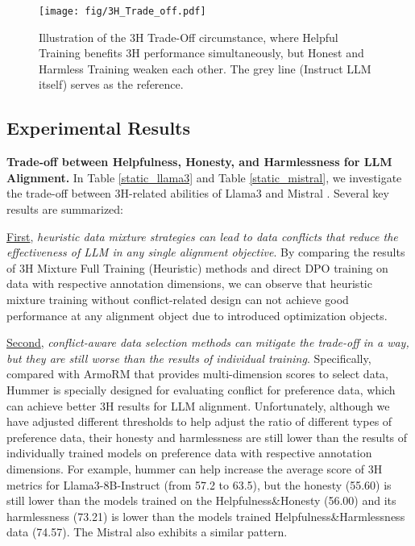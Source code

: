 \begin{figure}[tb]
    \centering
    \texttt{[image: fig/3H\_Trade\_off.pdf]} %
    \caption{Illustration of the 3H Trade-Off circumstance, where Helpful Training benefits 3H performance simultaneously, but Honest and Harmless Training weaken each other. The grey line (Instruct LLM itself) serves as the reference. }
    \label{fig:3H_trade_off}
\end{figure}
\subsection{Experimental Results}

\textbf{Trade-off between Helpfulness, Honesty, and Harmlessness for LLM Alignment.} In Table \ref{static_llama3} and Table \ref{static_mistral}, we investigate the trade-off between 3H-related abilities of Llama3 \cite{dubey2024llama} and Mistral \cite{jiang2023mistral}. Several key results are summarized:

\underline{First}, \textit{heuristic data mixture strategies can lead to data conflicts that reduce the effectiveness of LLM in any single alignment objective}. By comparing the results of 3H Mixture Full Training (Heuristic) methods and direct DPO training on data with respective annotation dimensions, we can observe that heuristic mixture training without conflict-related design can not achieve good performance at any alignment object due to introduced optimization objects.

\underline{Second}, \textit{conflict-aware data selection methods can mitigate the trade-off in a way, but they are still worse than the results of individual training}. Specifically, compared with ArmoRM that provides multi-dimension scores to select data, Hummer is specially designed for evaluating conflict for preference data, which can achieve better 3H results for LLM alignment. Unfortunately, although we have adjusted different thresholds to help adjust the ratio of different types of preference data, their honesty and harmlessness are still lower than the results of individually trained models on preference data with respective annotation dimensions. For example, hummer can help increase the average score of 3H metrics for Llama3-8B-Instruct (from 57.2 to 63.5), but the honesty (55.60) is still lower than the models trained on the Helpfulness\&Honesty (56.00) and its harmlessness (73.21) is lower than the models trained Helpfulness\&Harmlessness data (74.57). The Mistral also exhibits a similar pattern.


